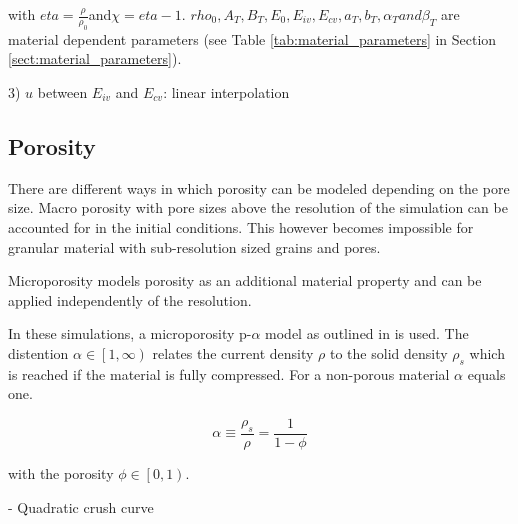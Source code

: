 with $eta = \frac{\rho}{\rho_0} $and$\chi = eta - 1$. $rho_0, A_T, B_T, E_0, E_{iv}, E_{cv}, a_T, b_T, \alpha_T and \beta_T$ are material dependent parameters (see Table \ref{tab:material_parameters} in Section \ref{sect:material_parameters}).

3) $u$ between $E_{iv}$ and $E_{cv}$: linear interpolation


\subsection{Porosity}
There are different ways in which porosity can be modeled depending on the pore size. Macro porosity with pore sizes above the resolution of the simulation can be accounted for in the initial conditions. This however becomes impossible for granular material with sub-resolution sized grains and pores.

Microporosity models porosity as an additional material property and can be applied independently of the resolution.

In these simulations, a microporosity p-$\alpha$ model as outlined in \cite{Jutzi_2008} is used. The distention $\alpha \in \left[1,\infty\right)$ relates the current density $\rho$ to the solid density $\rho_s$ which is reached if the material is fully compressed. For a non-porous material $\alpha$ equals one.

\begin{equation}
    \alpha \equiv \frac{\rho_s}{\rho} = \frac{1}{1 - \phi}
\end{equation}

with the porosity $\phi \in \left[0, 1\right)$.

- Quadratic crush curve

